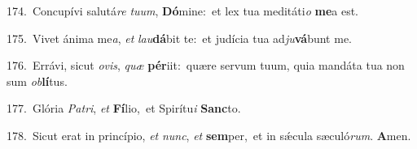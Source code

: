 {\numbfont\textcolor{\numbcolor}{174.}}~Concupívi salutá\textit{re} \textit{tu}\-\textit{um}, \textbf{Dó}\-mine:~\star et lex tua meditáti\textit{o} \textbf{me}\-a est.\par
{\numbfont\textcolor{\numbcolor}{175.}}~Vivet ánima me\-\textit{a}\-, \textit{et} \textit{lau}\-\textbf{dá}bit te:~\star et judícia tua ad\-\textit{ju}\-\textbf{vá}bunt me.\par
{\numbfont\textcolor{\numbcolor}{176.}}~Errávi, sicut \textit{o}\-\textit{vis}, \textit{quæ} \textbf{pér}\-iit:~\star quære servum tuum, quia mandáta tua non sum \textit{ob}\-\textbf{lí}tus.\par
{\numbfont\textcolor{\numbcolor}{177.}}~Glória \textit{Pa}\-\textit{tri}, \textit{et} \textbf{Fí}\-lio,~\star et Spirítu\textit{i} \textbf{Sanc}\-to.\par
{\numbfont\textcolor{\numbcolor}{178.}}~Sicut erat in princípio, \textit{et} \textit{nunc}\-, \textit{et} \textbf{sem}\-per,~\star et in sǽcula sæculó\-\textit{rum}\-. \textbf{A}\-men.\par
